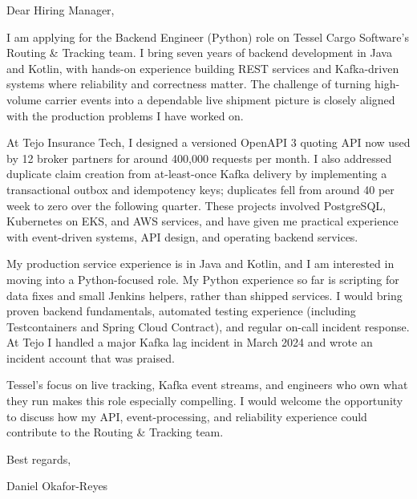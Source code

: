 \documentclass[11pt,a4paper]{article}
\begin{document}
\color{primarycolor}

Dear Hiring Manager,\par
\vspace{0.8em}

I am applying for the Backend Engineer (Python) role on Tessel Cargo Software's Routing & Tracking team. I bring seven years of backend development in Java and Kotlin, with hands-on experience building REST services and Kafka-driven systems where reliability and correctness matter. The challenge of turning high-volume carrier events into a dependable live shipment picture is closely aligned with the production problems I have worked on.\par
\vspace{0.8em}

At Tejo Insurance Tech, I designed a versioned OpenAPI 3 quoting API now used by 12 broker partners for around 400,000 requests per month. I also addressed duplicate claim creation from at-least-once Kafka delivery by implementing a transactional outbox and idempotency keys; duplicates fell from around 40 per week to zero over the following quarter. These projects involved PostgreSQL, Kubernetes on EKS, and AWS services, and have given me practical experience with event-driven systems, API design, and operating backend services.\par
\vspace{0.8em}

My production service experience is in Java and Kotlin, and I am interested in moving into a Python-focused role. My Python experience so far is scripting for data fixes and small Jenkins helpers, rather than shipped services. I would bring proven backend fundamentals, automated testing experience (including Testcontainers and Spring Cloud Contract), and regular on-call incident response. At Tejo I handled a major Kafka lag incident in March 2024 and wrote an incident account that was praised.\par
\vspace{0.8em}

Tessel's focus on live tracking, Kafka event streams, and engineers who own what they run makes this role especially compelling. I would welcome the opportunity to discuss how my API, event-processing, and reliability experience could contribute to the Routing & Tracking team.\par
\vspace{1em}

Best regards,\par
Daniel Okafor-Reyes
\end{document}
